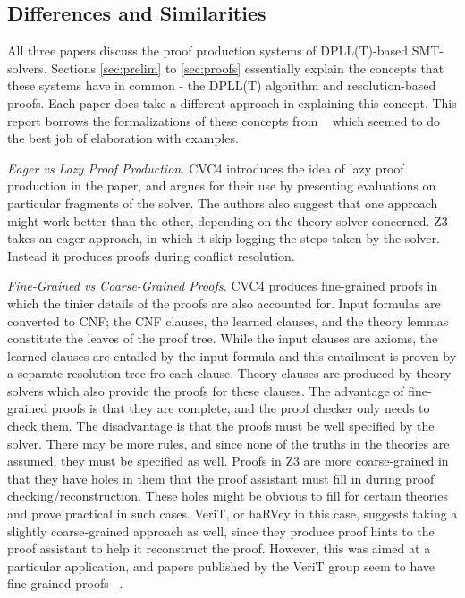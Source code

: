 \documentclass{article}
\begin{document}
\subsection{Differences and Similarities}
All three papers discuss the proof production systems of 
DPLL(T)-based SMT-solvers. Sections \ref{sec:prelim} to 
\ref{sec:proofs} essentially explain the concepts that 
these systems have in common - the DPLL(T) algorithm and 
resolution-based proofs. Each paper does take a different
approach in explaining this concept. This report borrows 
the formalizations of these concepts from 
~\cite{DBLP:conf/fmcad/KatzBTRH16} which seemed to 
do the best job of elaboration with examples.

\textit{Eager vs Lazy Proof Production.} CVC4 introduces 
the idea of lazy proof production in the paper, and argues 
for their use by presenting evaluations on particular 
fragments of the solver. The authors also suggest that one 
approach might work better than the other, depending on 
the theory solver concerned. Z3 takes an eager approach, 
in which it skip logging the steps taken by the solver.
Instead it produces proofs during conflict resolution.
 
\textit{Fine-Grained vs Coarse-Grained Proofs.} CVC4 
produces fine-grained proofs in which the tinier
details of the proofs are also accounted for. 
Input formulas are converted 
to CNF; the CNF clauses, the learned clauses, and the 
theory lemmas constitute the leaves of the proof tree.
While the input clauses are axioms, the learned clauses 
are entailed by the input formula and this entailment is
proven by a separate resolution tree fro each clause. 
Theory clauses are produced by theory solvers which 
also provide the proofs for these clauses. The advantage 
of fine-grained proofs is that they are complete, and 
the proof checker only needs to check them. The disadvantage
is that the proofs must be well specified by the solver.
There may be more rules, and since none of the 
truths in the theories are assumed, they must be specified 
as well. Proofs in Z3 are more coarse-grained in that they
have holes in them that the proof assistant must fill in
during proof checking/reconstruction. These holes might be 
obvious to fill for certain theories and prove practical 
in such cases. VeriT, or haRVey in this case, suggests 
taking a slightly coarse-grained approach as well, since 
they produce proof hints to the proof assistant to 
help it reconstruct the proof. However, this was aimed 
at a particular application, and papers published by 
the VeriT group seem to have fine-grained proofs 
~\cite{DBLP:conf/cade/BarbosaBF17}.
\end{document}
